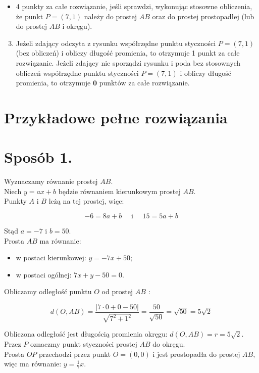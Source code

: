 \documentclass[10pt]{article}
\begin{document}
\begin{itemize}
  \item 4 punkty za całe rozwiązanie, jeśli sprawdzi, wykonując stosowne obliczenia, że punkt $P=(7,1)$ należy do prostej $A B$ oraz do prostej prostopadłej (lub do prostej $A B$ i okręgu).
\end{itemize}

\begin{enumerate}
  \setcounter{enumi}{2}
  \item Jeżeli zdający odczyta z rysunku współrzędne punktu styczności $P=(7,1)$ (bez obliczeń) i obliczy długość promienia, to otrzymuje 1 punkt za całe rozwiązanie. Jeżeli zdający nie sporządzi rysunku i poda bez stosownych obliczeń współrzędne punktu styczności $P=(7,1)$ i obliczy długość promienia, to otrzymuje $\mathbf{0}$ punktów za całe rozwiązanie.
\end{enumerate}

\section*{Przykładowe pełne rozwiązania}
\section*{Sposób 1.}
Wyznaczamy równanie prostej $A B$.\\
Niech $y=a x+b$ będzie równaniem kierunkowym prostej $A B$.\\
Punkty $A$ i $B$ leżą na tej prostej, więc:

$$
-6=8 a+b \quad \text { i } \quad 15=5 a+b
$$

Stąd $a=-7$ i $b=50$.\\
Prosta $A B$ ma równanie:

\begin{itemize}
  \item w postaci kierunkowej: $y=-7 x+50$;
  \item w postaci ogólnej: $7 x+y-50=0$.
\end{itemize}

Obliczamy odległość punktu $O$ od prostej $A B$ :

$$
d(O, A B)=\frac{|7 \cdot 0+0-50|}{\sqrt{7^{2}+1^{2}}}=\frac{50}{\sqrt{50}}=\sqrt{50}=5 \sqrt{2}
$$

Obliczona odległość jest długością promienia okręgu: $d(O, A B)=r=5 \sqrt{2}$.\\
Przez $P$ oznaczmy punkt styczności prostej $A B$ do okręgu.\\
Prosta $O P$ przechodzi przez punkt $O=(0,0)$ i jest prostopadła do prostej $A B$, więc ma równanie: $y=\frac{1}{7} x$.
\end{document}
